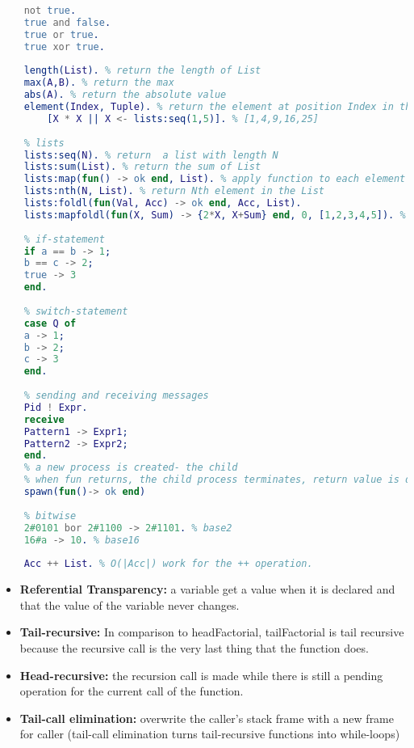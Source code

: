 \documentclass[../main.tex]{subfiles}
\begin{document}
\begin{lstlisting}[language=erlang]
    % boolean expressions
    not true.
    true and false.
    true or true.
    true xor true.
    
    length(List). % return the length of List
    max(A,B). % return the max
    abs(A). % return the absolute value
    element(Index, Tuple). % return the element at position Index in the Tuple
    	[X * X || X <- lists:seq(1,5)]. % [1,4,9,16,25]
    
    % lists
    lists:seq(N). % return  a list with length N
    lists:sum(List). % return the sum of List
    lists:map(fun() -> ok end, List). % apply function to each element in the List
    lists:nth(N, List). % return Nth element in the List
    lists:foldl(fun(Val, Acc) -> ok end, Acc, List).
    lists:mapfoldl(fun(X, Sum) -> {2*X, X+Sum} end, 0, [1,2,3,4,5]). % {[2,4,6,8,10],15}
    
    % if-statement
    if a == b -> 1;
    b == c -> 2;
    true -> 3
    end.
    
    % switch-statement
    case Q of
    a -> 1;
    b -> 2;
    c -> 3
    end.
    
    % sending and receiving messages
    Pid ! Expr.
    receive
    Pattern1 -> Expr1;
    Pattern2 -> Expr2;
    end.
    % a new process is created- the child
    % when fun returns, the child process terminates, return value is discarded.
    spawn(fun()-> ok end)
    
    % bitwise
    2#0101 bor 2#1100 -> 2#1101. % base2
    16#a -> 10. % base16
    
    Acc ++ List. % O(|Acc|) work for the ++ operation.
\end{lstlisting}


\begin{itemize}
	\item \textbf{Referential Transparency:} a variable get a value when it is declared and that the value of the variable never changes.
	\item \textbf{Tail-recursive:} In comparison to headFactorial, tailFactorial is tail recursive because the recursive call is the very last thing that the function does.
	\item \textbf{Head-recursive:} the recursion call is made while there is still a pending operation for the current call of the function.
	\item \textbf{Tail-call elimination:} overwrite the caller’s stack frame with a new frame for caller (tail-call elimination turns tail-recursive functions into while-loops)
\end{itemize}
\end{document}
